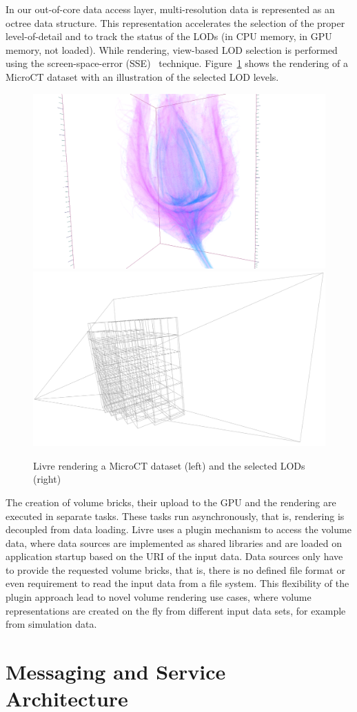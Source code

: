 \documentclass[10pt]{llncs}
\newcommand{\fig}[1]{Figure~\ref{#1}}
\begin{document}
In our out-of-core data access layer, multi-resolution data is represented as an
octree data structure. This representation accelerates the selection of the
proper level-of-detail and to track the status of the LODs (in CPU memory, in
GPU memory, not loaded). While rendering, view-based LOD selection is performed
using the screen-space-error (SSE)~\cite{guthe2004} technique. \fig{fLivre}
shows the rendering of a MicroCT dataset with an illustration of the selected
LOD levels.

\begin{figure}[t]
    \includegraphics[width=.49\columnwidth]{images/livre}\hfill
    \includegraphics[width=.49\columnwidth]{images/livreLOD}
  \caption{\label{fLivre}Livre rendering a MicroCT dataset (left) and
    the selected LODs (right)}
\end{figure}

The creation of volume bricks, their upload to the GPU and the rendering are
executed in separate tasks. These tasks run asynchronously, that is, rendering
is decoupled from data loading. Livre uses a plugin mechanism to access the
volume data, where data sources are implemented as shared libraries and are
loaded on application startup based on the URI of the input data. Data sources
only have to provide the requested volume bricks, that is, there is no defined
file format or even requirement to read the input data from a file system. This
flexibility of the plugin approach lead to novel volume rendering use cases,
where volume representations are created on the fly from different input data
sets, for example from simulation data.

\clearpage
\section{Messaging and Service Architecture}
\end{document}
